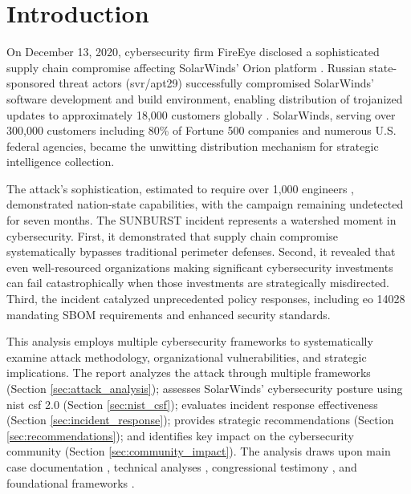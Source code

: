 \section{Introduction}

On December 13, 2020, cybersecurity firm FireEye disclosed a sophisticated supply chain compromise affecting SolarWinds' Orion platform \cite{mandiant_highly_2020}. Russian state-sponsored threat actors (\gls{svr}/\gls{apt}29) successfully compromised SolarWinds' software development and build environment, enabling distribution of trojanized updates to approximately 18,000 customers globally \cite{nagle_solarwinds_2023}. SolarWinds, serving over 300,000 customers including 80\% of Fortune 500 companies and numerous U.S. federal agencies, became the unwitting distribution mechanism for strategic intelligence collection.

The attack's sophistication, estimated to require over 1,000 engineers \cite{ms_analyzing_2020}, demonstrated nation-state capabilities, with the campaign remaining undetected for seven months. The SUNBURST incident represents a watershed moment in cybersecurity. First, it demonstrated that supply chain compromise systematically bypasses traditional perimeter defenses. Second, it revealed that even well-resourced organizations making significant cybersecurity investments can fail catastrophically when those investments are strategically misdirected. Third, the incident catalyzed unprecedented policy responses, including \gls{eo} 14028 \cite{us_eo_2021} mandating SBOM requirements and enhanced security standards.

This analysis employs multiple cybersecurity frameworks to systematically examine attack methodology, organizational vulnerabilities, and strategic implications. The report analyzes the attack through multiple frameworks (Section \ref{sec:attack_analysis}); assesses SolarWinds' cybersecurity posture using \gls{nist} \gls{csf} 2.0 (Section \ref{sec:nist_csf}); evaluates incident response effectiveness (Section \ref{sec:incident_response}); provides strategic recommendations (Section \ref{sec:recommendations}); and identifies key impact on the cybersecurity community (Section \ref{sec:community_impact}). The analysis draws upon main case documentation \cite{nagle_solarwinds_2023}, technical analyses \cite{eckels_sunburst_2020, mandiant_highly_2020, ms_analyzing_2020}, congressional testimony \cite{us_open_2021}, and foundational frameworks \cite{boyens_cybersecurity_2022, nelson_incident_2025, pascoe_nist_2024, rose_zero_2020, strom_mitre_2018}.
